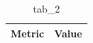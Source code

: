 \begin{table}[htbp]
\centering
\caption{tab_2}
\label{tab:tab_2}
\begin{tabular}{ll}
\toprule
Metric & Value \\
\midrule
\bottomrule
\end{tabular}
\end{table}